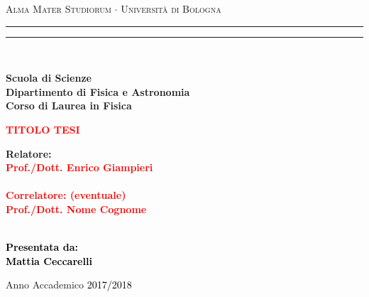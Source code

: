 \documentclass[12pt,a4paper]{report}
\begin{document}
\begin{titlepage}

%
%
%
%
\begin{center}
{{\Large{\textsc{Alma Mater Studiorum $\cdot$ Universit\`a di Bologna}}}} 
\rule[0.1cm]{15.8cm}{0.1mm}
\rule[0.5cm]{15.8cm}{0.6mm}
\\\vspace{3mm}

{\small{\bf Scuola di Scienze \\ 
Dipartimento di Fisica e Astronomia\\
Corso di Laurea in Fisica}}

\end{center}

\vspace{23mm}

\begin{center}\textcolor{red}{
%
%
{\LARGE{\bf TITOLO TESI}}\\
}\end{center}

\vspace{50mm} \par \noindent

\begin{minipage}[t]{0.47\textwidth}
%
%
{\large{\bf Relatore: \vspace{2mm}\\\textcolor{red}{
Prof./Dott. Enrico Giampieri}\\\\
%
%
%
\textcolor{red}{
\bf Correlatore: (eventuale)
\vspace{2mm}\\
Prof./Dott. Nome Cognome\\\\}}}
\end{minipage}
%
\hfill
%
\begin{minipage}[t]{0.47\textwidth}\raggedleft \textcolor{black}{
{\large{\bf Presentata da:
\vspace{2mm}\\
%
%
Mattia Ceccarelli}}}
\end{minipage}

\vspace{40mm}

\begin{center}
%
%
Anno Accademico \textcolor{black}{ 2017/2018}
\end{center}

\end{titlepage}
\end{document}
